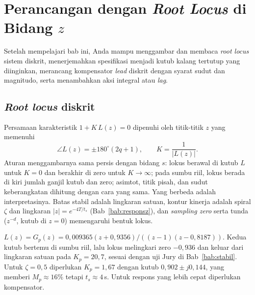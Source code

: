 \chapter{Perancangan dengan \textit{Root Locus} di Bidang $z$}
\label{bab:rlocus}

\begin{tujuan}
	Setelah mempelajari bab ini, Anda mampu menggambar dan membaca \textit{root locus} sistem diskrit, menerjemahkan spesifikasi menjadi kutub kalang tertutup yang diinginkan, merancang kompensator \textit{lead} diskrit dengan syarat sudut dan magnitudo, serta menambahkan aksi integral atau \textit{lag}.
\end{tujuan}

\section{\textit{Root locus} diskrit}
Persamaan karakteristik $1 + K\,L(z) = 0$ dipenuhi oleh titik-titik $z$ yang memenuhi
\begin{equation}
	\angle L(z) = \pm180^\circ(2q+1),\qquad K = \frac{1}{|L(z)|}.
\end{equation}
Aturan menggambarnya sama persis dengan bidang $s$: lokus berawal di kutub $L$ untuk $K = 0$ dan berakhir di zero untuk $K \to \infty$; pada sumbu riil, lokus berada di kiri jumlah ganjil kutub dan zero; asimtot, titik pisah, dan sudut keberangkatan dihitung dengan cara yang sama. Yang berbeda adalah interpretasinya. Batas stabil adalah lingkaran satuan, kontur kinerja adalah spiral $\zeta$ dan lingkaran $|z| = e^{-4T/t_s}$ (Bab~\ref{bab:responsz}), dan \textit{sampling zero} serta tunda ($z^{-d}$, kutub di $z = 0$) memengaruhi bentuk lokus.

\begin{contoh}
	$L(z) = G_p(z) = 0{,}009365(z + 0{,}9356)/((z-1)(z-0{,}8187))$. Kedua kutub bertemu di sumbu riil, lalu lokus melingkari zero $-0{,}936$ dan keluar dari lingkaran satuan pada $K_p = 20{,}7$, sesuai dengan uji Jury di Bab~\ref{bab:stabil}. Untuk $\zeta = 0{,}5$ diperlukan $K_p = 1{,}67$ dengan kutub $0{,}902 \pm j0{,}144$, yang memberi $M_p \approx 16\%$ tetapi $t_s \approx 4$\,s. Untuk respons yang lebih cepat diperlukan kompensator.
\end{contoh}


